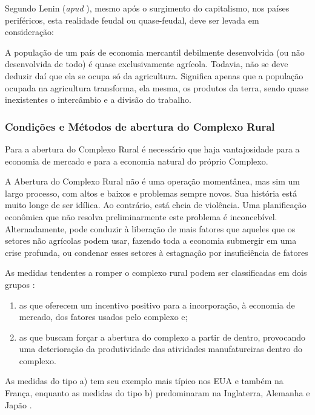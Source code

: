 \documentclass[
	12pt,				%
	oneside,			%
	a4paper,			%
	chapter=TITLE,		%
	section=TITLE,		%
	english,			%
	brazil				%
	]{abntex2}
\begin{document}
Segundo Lenin (\emph{apud} \textcite[p.~99]{rangel1954}), mesmo após o surgimento do capitalismo,
nos países periféricos, esta realidade feudal ou quase-feudal, deve ser levada
em consideração:
\begin{citacao} 
A população de um país de economia mercantil debilmente desenvolvida (ou não 
desenvolvida de todo) é quase exclusivamente agrícola. Todavia, não se deve 
deduzir daí que ela se ocupa só da agricultura. Significa apenas que a população 
ocupada na agricultura transforma, ela mesma, os produtos da terra, sendo quase 
inexistentes o intercâmbio e a divisão do trabalho. 
\end{citacao}
\hypertarget{condiuxe7uxf5es-e-muxe9todos-de-abertura-do-complexo-rural}{%
\subsubsection{Condições e Métodos de abertura do Complexo Rural}\label{condiuxe7uxf5es-e-muxe9todos-de-abertura-do-complexo-rural}}

Para a abertura do Complexo Rural é necessário que haja vantajosidade para a
economia de mercado e para a economia natural do próprio Complexo.
\begin{citacao} 
A Abertura do Complexo Rural não é uma operação momentânea, mas sim um largo
processo, com altos e baixos e problemas sempre novos. Sua história está muito
longe de ser idílica. Ao contrário, está cheia de violência. Uma planificação
econômica que não resolva preliminarmente este problema é inconcebível.
Alternadamente, pode conduzir à liberação de mais fatores que aqueles que os
setores não agrícolas podem usar, fazendo toda a economia submergir em uma crise
profunda, ou condenar esses setores à estagnação por insuficiência de
fatores \cite[p.~118]{rangel1954}
\end{citacao}
As medidas tendentes a romper o complexo rural podem ser classificadas em dois
grupos \autocite[113]{rangel1954}:
\begin{enumerate}
\def\labelenumi{\alph{enumi}.}
\item
  as que oferecem um incentivo positivo para a incorporação, à economia de
  mercado, dos fatores usados pelo complexo e;
\item
  as que buscam forçar a abertura do complexo a partir de dentro, provocando
  uma deterioração da produtividade das atividades manufatureiras dentro do
  complexo.
\end{enumerate}
As medidas do tipo a) tem seu exemplo mais típico nos EUA e também na França,
enquanto as medidas do tipo b) predominaram na Inglaterra, Alemanha e Japão
\autocite[114-115]{rangel1954}.
\end{document}
